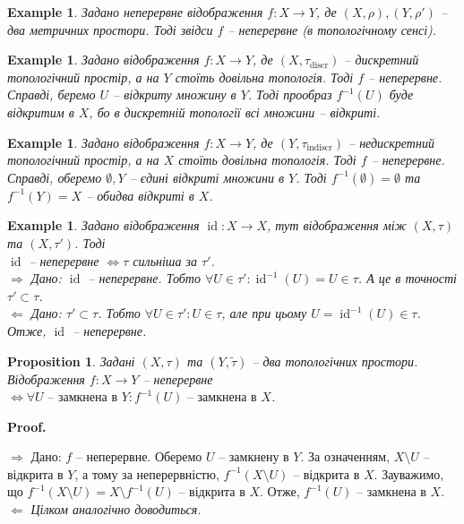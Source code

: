 \documentclass[a4paper, 10pt]{article}
\makeatletter
\def\rightproof{$\boxed{\Rightarrow}$ }
\def\leftproof{$\boxed{\Leftarrow}$ }
\theoremstyle{theoremdd}
\newtheorem{example}[theorem]{Example}
\newtheorem{proposition}[theorem]{Proposition}
\DeclareMathOperator{\id}{id}
\renewenvironment{proof}[1][Proof.\\]{\par
\pushQED{\hfill \qed}%
\normalfont \topsep6\p@\@plus6\p@\relax
\trivlist
\item\relax
{\bfseries
#1\@addpunct{.}}\hspace\labelsep\ignorespaces
}{%
\popQED\endtrivlist\@endpefalse
}
\makeatother
\begin{document}
\begin{example}
Задано неперервне відображення $f \colon X \to Y$, де $(X,\rho), (Y,\rho')$ -- два метричних простори. Тоді звідси $f$ -- неперервне (в топологічному сенсі).
\end{example}

\begin{example}
Задано відображення $f \colon X \to Y$, де $(X,\tau_{\text{discr}})$ -- дискретний топологічний простір, а на $Y$ стоїть довільна топологія. Тоді $f$ -- неперервне.\\
Справді, беремо $U$ -- відкриту множину в $Y$. Тоді прообраз $f^{-1}(U)$ буде відкритим в $X$, бо в дискретній топології всі множини -- відкриті.
\end{example}

\begin{example}
Задано відображення $f \colon X \to Y$, де $(Y,\tau_{\text{indiscr}})$ -- недискретний топологічний простір, а на $X$ стоїть довільна топологія. Тоді $f$ -- неперервне.\\
Справді, оберемо $\emptyset,Y$ -- єдині відкриті множини в $Y$. Тоді $f^{-1}(\emptyset) = \emptyset$ та $f^{-1}(Y) = X$ -- обидва відкриті в $X$.
\end{example}

\begin{example}
Задано відображення $\id \colon X \to X$, тут відображення між $(X,\tau)$ та $(X,\tau')$. Тоді \\
$\id$ -- неперервне $\iff \tau$ сильніша за $\tau'$.\\
\rightproof Дано: $\id$ -- неперервне. Тобто $\forall U \in \tau': \id^{-1}(U) = U \in \tau$. А це в точності $\tau' \subset \tau$.\\
\leftproof Дано: $\tau' \subset \tau$. Тобто $\forall U \in \tau': U \in \tau$, але при цьому $U = \id^{-1}(U) \in \tau$. Отже, $\id$ -- неперервне.
\end{example}

\begin{proposition}
Задані $(X,\tau)$ та $(Y,\tilde{\tau})$ -- два топологічних простори.\\
Відображення $f \colon X \to Y$ -- неперервне $\iff \forall U \text{ -- замкнена в } Y: f^{-1}(U) \text{ -- замкнена в } X$.
\end{proposition}

\begin{proof}
\rightproof Дано: $f$ -- неперервне. Оберемо $U$ -- замкнену в $Y$. За означенням, $X \setminus U$ -- відкрита в $Y$, а тому за неперервністю, $f^{-1}(X \setminus U)$ -- відкрита в $X$. Зауважимо, що $f^{-1}(X \setminus U) = X \setminus f^{-1}(U)$ -- відкрита в $X$. Отже, $f^{-1}(U)$ -- замкнена в $X$.
\bigskip \\
\leftproof \textit{Цілком аналогічно доводиться.}
\end{proof}
\end{document}
